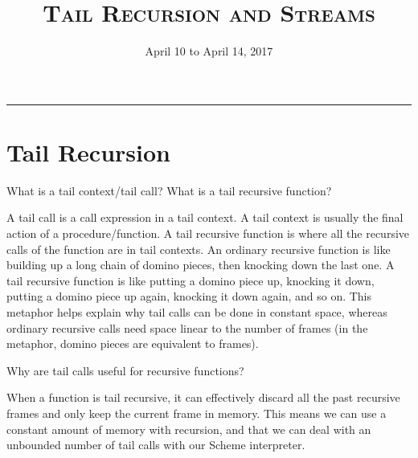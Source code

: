 \documentclass{exam}
\title{\textsc{Tail Recursion and Streams}}
\date{April 10 to April 14, 2017}
\begin{document}
\maketitle
\rule{\textwidth}{0.15em}
\fontsize{12}{15}\selectfont


\section{Tail Recursion}
\begin{questions}
\question What is a tail context/tail call? What is a tail recursive function?
\begin{solution}[0.5in]
A tail call is a call expression in a tail context. A tail context is usually the final action of a procedure/function.\newline
\newline
A tail recursive function is where all the recursive calls of the function are in tail contexts. \newline
\newline
An ordinary recursive function is like building up a long chain of domino pieces, then knocking down the last one. A tail recursive function is like putting a domino piece up, knocking it down, putting a domino piece up again, knocking it down again, and so on. This metaphor helps explain why tail calls can be done in constant space, whereas ordinary recursive calls need space linear to the number of frames (in the metaphor, domino pieces are equivalent to frames).
\end{solution}
\question Why are tail calls useful for recursive functions?
\begin{solution}[0.5in]
When a function is tail recursive, it can effectively discard all the past recursive frames and only keep the current frame in memory. This means we can use a constant amount of memory with recursion, and that we can deal with an unbounded number of tail calls with our Scheme interpreter.
\end{solution}


\end{questions}
\end{document}

